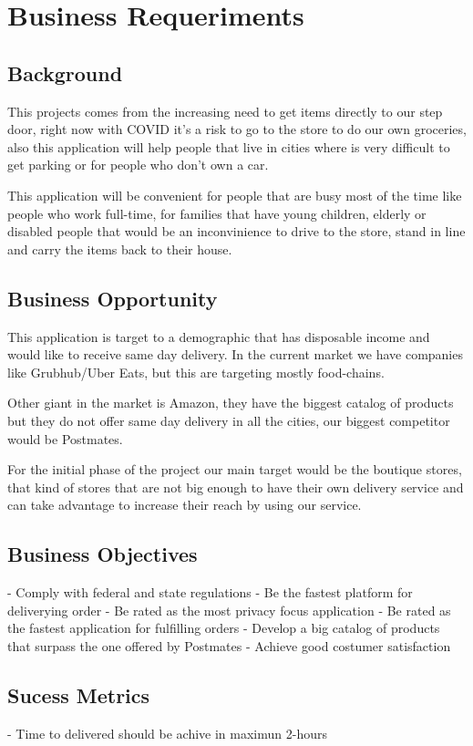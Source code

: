 \section{Business Requeriments}
\subsection{Background}
This projects comes from the increasing need to get items directly to our 
step door, right now with COVID it's a risk to go to the store to do our own
groceries, also this application will help people that live in cities where 
is very difficult to get parking or for people who don't own a car. 

This application will be convenient for people that are busy most of the time
like people who work full-time, for families that have young children,
elderly or disabled people that would be an inconvinience to drive to the 
store, stand in line and carry the items back to their house.

\subsection{Business Opportunity}
This application is target to a demographic that has disposable income and 
would like to receive same day delivery. In the current market we have 
companies like Grubhub/Uber Eats, but this are targeting mostly food-chains.

Other giant in the market is Amazon, they have the biggest catalog of products
but they do not offer same day delivery in all the cities, our biggest 
competitor would be Postmates.

For the initial phase of the project our main target would be the boutique 
stores, that kind of stores that are not big enough to have their own delivery
service and can take advantage to increase their reach by using our service.

\subsection{Business Objectives}
- Comply with federal and state regulations
- Be the fastest platform for deliverying order
- Be rated as the most privacy focus application 
- Be rated as the fastest application for fulfilling orders
- Develop a big catalog of products that surpass the one offered by Postmates
- Achieve good costumer satisfaction

\subsection{Sucess Metrics}
- Time to delivered should be achive in maximun 2-hours


